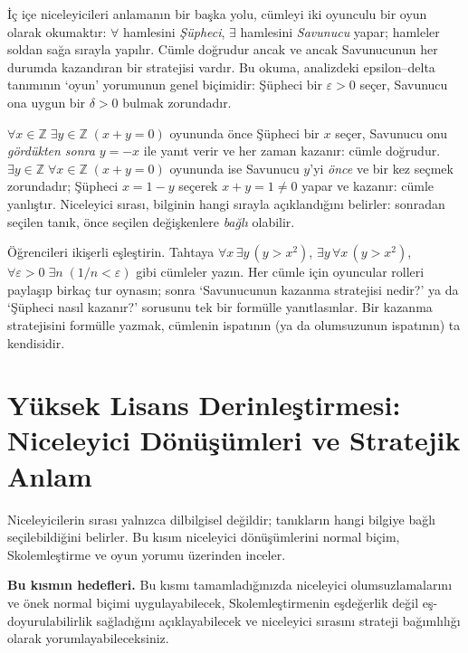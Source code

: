 İç içe niceleyicileri anlamanın bir başka yolu, cümleyi iki oyunculu bir oyun olarak okumaktır: $\forall$ hamlesini \emph{Şüpheci}, $\exists$ hamlesini \emph{Savunucu} yapar; hamleler soldan sağa sırayla yapılır. Cümle doğrudur ancak ve ancak Savunucunun her durumda kazandıran bir stratejisi vardır. Bu okuma, analizdeki epsilon–delta tanımının ‘oyun’ yorumunun genel biçimidir: Şüpheci bir $\varepsilon>0$ seçer, Savunucu ona uygun bir $\delta>0$ bulmak zorundadır.

\begin{ornek}
$\forall x\in\mathbb Z\;\exists y\in\mathbb Z\;(x+y=0)$ oyununda önce Şüpheci bir $x$ seçer, Savunucu onu \emph{gördükten sonra} $y=-x$ ile yanıt verir ve her zaman kazanır: cümle doğrudur. $\exists y\in\mathbb Z\;\forall x\in\mathbb Z\;(x+y=0)$ oyununda ise Savunucu $y$’yi \emph{önce} ve bir kez seçmek zorundadır; Şüpheci $x=1-y$ seçerek $x+y=1\neq0$ yapar ve kazanır: cümle yanlıştır. Niceleyici sırası, bilginin hangi sırayla açıklandığını belirler: sonradan seçilen tanık, önce seçilen değişkenlere \emph{bağlı} olabilir.
\end{ornek}

\begin{sinif}
Öğrencileri ikişerli eşleştirin. Tahtaya $\forall x\,\exists y\,(y>x^2)$, $\exists y\,\forall x\,(y>x^2)$, $\forall\varepsilon>0\;\exists n\;(1/n<\varepsilon)$ gibi cümleler yazın. Her cümle için oyuncular rolleri paylaşıp birkaç tur oynasın; sonra ‘Savunucunun kazanma stratejisi nedir?’ ya da ‘Şüpheci nasıl kazanır?’ sorusunu tek bir formülle yanıtlasınlar. Bir kazanma stratejisini formülle yazmak, cümlenin ispatının (ya da olumsuzunun ispatının) ta kendisidir.
\end{sinif}

\section{Yüksek Lisans Derinleştirmesi: Niceleyici Dönüşümleri ve Stratejik Anlam}

Niceleyicilerin sırası yalnızca dilbilgisel değildir; tanıkların hangi bilgiye bağlı seçilebildiğini belirler. Bu kısım niceleyici dönüşümlerini normal biçim, Skolemleştirme ve oyun yorumu üzerinden inceler.

\textbf{Bu kısmın hedefleri.} Bu kısmı tamamladığınızda niceleyici olumsuzlamalarını ve önek normal biçimi uygulayabilecek, Skolemleştirmenin eşdeğerlik değil eş-doyurulabilirlik sağladığını açıklayabilecek ve niceleyici sırasını strateji bağımlılığı olarak yorumlayabileceksiniz.


